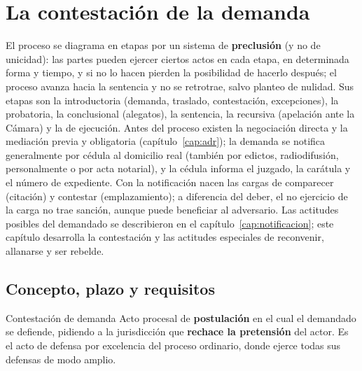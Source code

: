 \documentclass[12pt,oneside]{book}
\begin{document}
\chapter{La contestación de la demanda}
\label{cap:contestacion}

El proceso se diagrama en etapas por un sistema de \textbf{preclusión} (y no de unicidad): las partes pueden ejercer ciertos actos en cada etapa, en determinada forma y tiempo, y si no lo hacen pierden la posibilidad de hacerlo después; el proceso avanza hacia la sentencia y no se retrotrae, salvo planteo de nulidad. Sus etapas son la introductoria (demanda, traslado, contestación, excepciones), la probatoria, la conclusional (alegatos), la sentencia, la recursiva (apelación ante la Cámara) y la de ejecución. Antes del proceso existen la negociación directa y la mediación previa y obligatoria (capítulo~\ref{cap:adr}); la demanda se notifica generalmente por cédula al domicilio real (también por edictos, radiodifusión, personalmente o por acta notarial), y la cédula informa el juzgado, la carátula y el número de expediente. Con la notificación nacen las cargas de comparecer (citación) y contestar (emplazamiento); a diferencia del deber, el no ejercicio de la carga no trae sanción, aunque puede beneficiar al adversario. Las actitudes posibles del demandado se describieron en el capítulo~\ref{cap:notificacion}; este capítulo desarrolla la contestación y las actitudes especiales de reconvenir, allanarse y ser rebelde.

\section{Concepto, plazo y requisitos}

\begin{definicion}{Contestación de demanda}
Acto procesal de \textbf{postulación} en el cual el demandado se defiende, pidiendo a la jurisdicción que \textbf{rechace la pretensión} del actor. Es el acto de defensa por excelencia del proceso ordinario, donde ejerce todas sus defensas de modo amplio.
\end{definicion}
\end{document}
